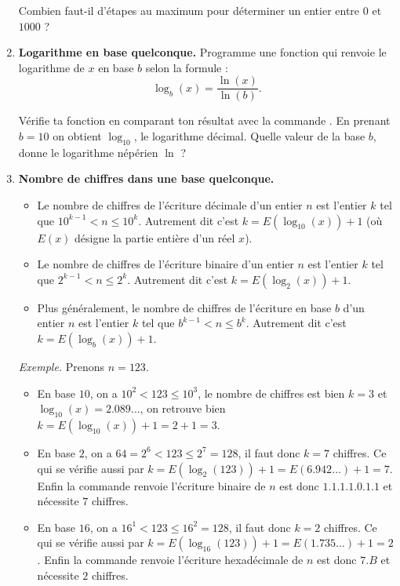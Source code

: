 \documentclass[11pt,class=report,crop=false]{standalone}
\begin{document}
\begin{activite}
\begin{enumerate}
  Combien faut-il d'étapes au maximum  pour déterminer un entier entre $0$ et $1000$ ?
  
  \item \textbf{Logarithme en base quelconque.}
  Programme une fonction  qui renvoie le logarithme de $x$ en base $b$ selon la formule :
  $$\log_b(x) = \frac{\ln(x)}{\ln(b)}.$$
  
  Vérifie ta fonction en comparant ton résultat avec la commande \Python{} .
  En prenant $b=10$ on obtient $\log_{10}$, le logarithme décimal. Quelle valeur de la base $b$, donne le logarithme népérien $\ln$ ?
  
  \item \textbf{Nombre de chiffres dans une base quelconque.}
  
  \begin{itemize}
    \item Le nombre de chiffres de l'écriture décimale d'un entier $n$ est l'entier $k$ tel que
    $10^{k-1} < n \le 10^{k}$. Autrement dit c'est $k = E\left( \log_{10} (x)\right )+1$ (où $E(x)$ désigne la partie entière d'un réel $x$).
    \item Le nombre de chiffres de l'écriture binaire d'un entier $n$ est l'entier $k$ tel que
    $2^{k-1} < n \le 2^{k}$. Autrement dit c'est $k = E\left( \log_{2} (x)\right )+1$.
    \item Plus généralement, le nombre de chiffres de l'écriture en base $b$ d'un entier $n$ est l'entier $k$ tel que  $b^{k-1} < n \le b^{k}$. Autrement dit c'est $k = E\left( \log_{b} (x)\right )+1$.
  \end{itemize}	  
   
   \emph{Exemple.} Prenons $n=123$.
   \begin{itemize}
     \item En base $10$, on a $10^2 < 123 \le 10^3$, le nombre de chiffres est bien $k=3$ et $\log_{10}(x)=2.089\ldots$, on retrouve bien $k=E(\log_{10}(x))+1 =  2+1=3$.
     
     \item En base $2$, on a $64 = 2^6 < 123 \le 2^7 = 128 $, il faut donc $k=7$ chiffres. Ce qui se vérifie aussi par $k = E(\log_2(123))+1 = E(6.942\ldots)+1 = 7$. Enfin la commande  renvoie  l'écriture binaire de $n$ est donc $1.1.1.1.0.1.1$ et nécessite $7$ chiffres.
     
     \item En base $16$, on a $16^1 < 123 \le 16^2 = 128$, il faut donc $k=2$ chiffres. Ce qui se vérifie aussi par $k = E(\log_{16}(123))+1 = E(1.735\ldots)+1 = 2$. Enfin la commande  renvoie  l'écriture hexadécimale de $n$ est donc $7.B$ et nécessite $2$ chiffres.
   \end{itemize} 
   

\end{enumerate}
\end{activite}
\end{document}
